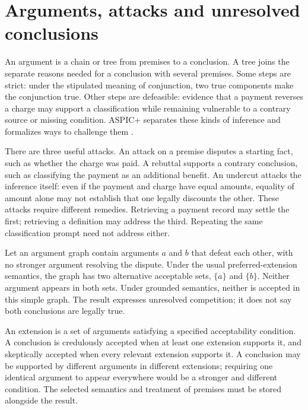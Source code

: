 \section{Arguments, attacks and unresolved conclusions}
\label{merge:M05:04}


An argument is a chain or tree from premises to a conclusion. A tree joins
the separate reasons needed for a conclusion with several premises. Some steps are strict:
under the stipulated meaning of conjunction, two true components make the
conjunction true. Other steps are defeasible: evidence that a payment reverses a
charge may support a classification while remaining vulnerable to a contrary
source or missing condition. ASPIC+ separates these kinds of inference and
formalizes ways to challenge them \citep[sections 2--3]{aspic2010}.

There are three useful attacks. An attack on a premise disputes a starting fact,
such as whether the charge was paid. A rebuttal supports a contrary conclusion,
such as classifying the payment as an additional benefit. An undercut attacks the
inference itself: even if the payment and charge have equal amounts, equality of
amount alone may not establish that one legally discounts the other. These
attacks require different remedies. Retrieving a payment record may settle the
first; retrieving a definition may address the third. Repeating the same
classification prompt need not address either.

Let an argument graph contain arguments $a$ and $b$ that defeat each other, with
no stronger argument resolving the dispute. Under the usual preferred-extension
semantics, the graph has two alternative acceptable sets, $\{a\}$ and $\{b\}$.
Neither argument appears in both sets. Under grounded semantics, neither is
accepted in this simple graph. The result expresses unresolved competition; it
does not say both conclusions are legally true.


An extension is a set of arguments satisfying a specified acceptability
condition. A conclusion is credulously accepted when at least one extension
supports it, and skeptically accepted when every relevant extension supports it.
A conclusion may be supported by different arguments in different extensions;
requiring one identical argument to appear everywhere would be a stronger and
different condition. The selected semantics and treatment of premises must be
stored alongside the result.

